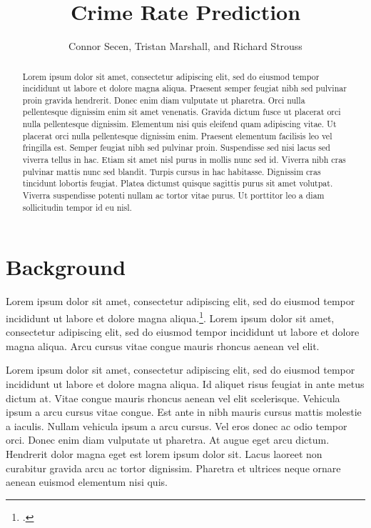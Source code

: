 \documentclass{cup-ino}
\title{Crime Rate Prediction}
\author{Connor Secen, Tristan Marshall, and Richard Strouss}
\begin{document}
\maketitle

\begin{abstract}
Lorem ipsum dolor sit amet, consectetur adipiscing elit, sed do eiusmod tempor incididunt ut labore et dolore magna aliqua. Praesent semper feugiat nibh sed pulvinar proin gravida hendrerit. Donec enim diam vulputate ut pharetra. Orci nulla pellentesque dignissim enim sit amet venenatis. Gravida dictum fusce ut placerat orci nulla pellentesque dignissim. Elementum nisi quis eleifend quam adipiscing vitae. Ut placerat orci nulla pellentesque dignissim enim. Praesent elementum facilisis leo vel fringilla est. Semper feugiat nibh sed pulvinar proin. Suspendisse sed nisi lacus sed viverra tellus in hac. Etiam sit amet nisl purus in mollis nunc sed id. Viverra nibh cras pulvinar mattis nunc sed blandit. Turpis cursus in hac habitasse. Dignissim cras tincidunt lobortis feugiat. Platea dictumst quisque sagittis purus sit amet volutpat. Viverra suspendisse potenti nullam ac tortor vitae purus. Ut porttitor leo a diam sollicitudin tempor id eu nisl.
\end{abstract}
\section{Background}
Lorem ipsum dolor sit amet, consectetur adipiscing elit, sed do eiusmod tempor incididunt ut labore et dolore magna aliqua.\footcite{rumelhart:hinton:williams}. Lorem ipsum dolor sit amet, consectetur adipiscing elit, sed do eiusmod tempor incididunt ut labore et dolore magna aliqua. Arcu cursus vitae congue mauris rhoncus aenean vel elit.

Lorem ipsum dolor sit amet, consectetur adipiscing elit, sed do eiusmod tempor incididunt ut labore et dolore magna aliqua. Id aliquet risus feugiat in ante metus dictum at. Vitae congue mauris rhoncus aenean vel elit scelerisque. Vehicula ipsum a arcu cursus vitae congue. Est ante in nibh mauris cursus mattis molestie a iaculis. Nullam vehicula ipsum a arcu cursus. Vel eros donec ac odio tempor orci. Donec enim diam vulputate ut pharetra. At augue eget arcu dictum. Hendrerit dolor magna eget est lorem ipsum dolor sit. Lacus laoreet non curabitur gravida arcu ac tortor dignissim. Pharetra et ultrices neque ornare aenean euismod elementum nisi quis.
\end{document}
